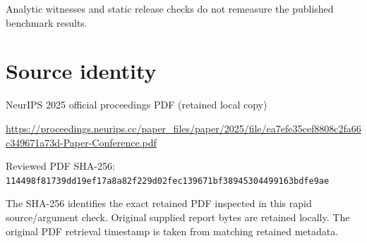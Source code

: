 \documentclass[11pt]{article}
\begin{document}
Analytic witnesses and static release checks do not remeasure the published benchmark results.\par

\section*{Source identity}

NeurIPS 2025 official proceedings PDF (retained local copy)

\url{https://proceedings.neurips.cc/paper_files/paper/2025/file/ea7efe35cef8808c2fa66c349671a73d-Paper-Conference.pdf}

Reviewed PDF SHA-256: \nolinkurl{114498f81739dd19ef17a8a82f229d02fec139671bf38945304499163bdfe9ae}

The SHA-256 identifies the exact retained PDF inspected in this rapid source/argument check. Original supplied report bytes are retained locally. The original PDF retrieval timestamp is taken from matching retained metadata.
\end{document}
